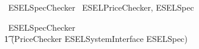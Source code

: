 \begin{zsection}
	\SECTION\ ESELSpecChecker \parents\ ESELPriceChecker, ESELSpec
\end{zsection}

\begin{circus}
    \circprocess\ ESELSpecChecker \circdef \\
        \t1 (PriceChecker \lpar ESELSystemInterface \rpar ESELSpec) \\
\end{circus}
